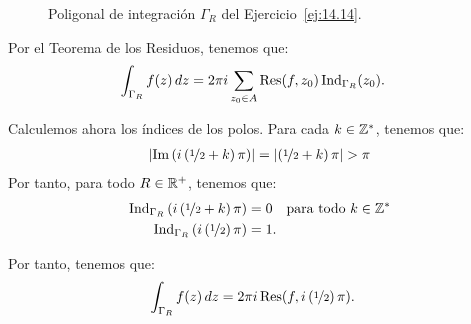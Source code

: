 \begin{ejercicio}
\begin{figure}
        \caption{Poligonal de integración $\Gamma_R$ del Ejercicio~\ref{ej:14.14}.}
        \label{fig:ej:14.14}
    \end{figure}

    Por el Teorema de los Residuos, tenemos que:
    \begin{align*}
        \int_{\Gamma_R} f(z) \, dz &= 2\pi i\sum_{z_0\in A}\Res(f,z_0)\Ind_{\Gamma_R}(z_0).
    \end{align*}

    Calculemos ahora los índices de los polos. Para cada $k\in \bb{Z}^*$, tenemos que:
    \begin{align*}
        \left|\Im\left(i\left(\nicefrac{1}{2} + k\right)\pi\right)\right| = \left|\left(\nicefrac{1}{2} + k\right)\pi\right| > \pi
    \end{align*}
    Por tanto, para todo $R\in \bb{R}^+$, tenemos que:
    \begin{align*}
        \Ind_{\Gamma_R}\left(i\left(\nicefrac{1}{2} + k\right)\pi\right) &= 0 \quad \text{para todo } k\in \bb{Z}^*\\
        \Ind_{\Gamma_R}\left(i\left(\nicefrac{1}{2}\right)\pi\right) &= 1.
    \end{align*}

    Por tanto, tenemos que:
    \begin{align*}
        \int_{\Gamma_R} f(z) \, dz &= 2\pi i\Res(f, i\left(\nicefrac{1}{2}\right)\pi).
    \end{align*}


\end{ejercicio}
